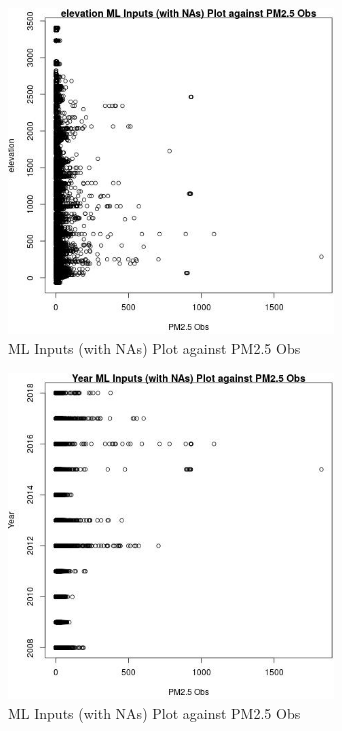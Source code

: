 \begin{figure} 
\centering  
\includegraphics[width=0.77\textwidth]{Code_Outputs/Report_ML_input_PM25_Step4_part_e_de_duplicated_aveswNAs_elevationvPM25_Obs.jpg} 
\caption{\label{fig:Report_ML_input_PM25_Step4_part_e_de_duplicated_aveswNAselevationvPM25_Obs}ML Inputs (with NAs) Plot against PM2.5 Obs} 
\end{figure} 
 

\begin{figure} 
\centering  
\includegraphics[width=0.77\textwidth]{Code_Outputs/Report_ML_input_PM25_Step4_part_e_de_duplicated_aveswNAs_YearvPM25_Obs.jpg} 
\caption{\label{fig:Report_ML_input_PM25_Step4_part_e_de_duplicated_aveswNAsYearvPM25_Obs}ML Inputs (with NAs) Plot against PM2.5 Obs} 
\end{figure} 
 

